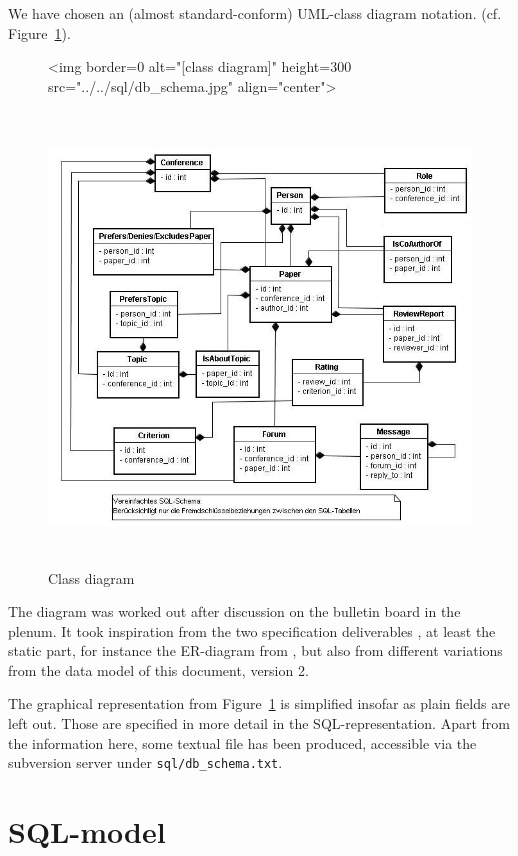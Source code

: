 We have chosen an (almost standard-conform) UML-class diagram notation.  (cf.
Figure~\ref{fig:classdiagram}).


\begin{figure}[htbp]
  \ifweb
  \centering
  \begin{rawhtml}
    <img border=0 alt="[class diagram]" height=300  src="../../sql/db_schema.jpg" align="center">
  \end{rawhtml}
  \else
  \centering
  \includegraphics[height=12cm]{../sql/db_schema}
  \fi
  \caption{Class diagram}
  \label{fig:classdiagram}
\end{figure}

The diagram was worked out after discussion on the bulletin board in the
plenum. It took inspiration from the two specification deliverables
\cite{coma:spec1} \cite{coma:spec2}, at least the static part, for instance
the ER-diagram from \cite{coma:spec1}, but also from different variations
from the data model of this document, version 2.

The graphical representation from Figure~\ref{fig:classdiagram} is
simplified insofar as plain fields are left out. Those are specified in
more detail in the SQL-representation. Apart from the information here,
some textual file has been produced, accessible via the subversion server under
\texttt{sql/db_schema.txt}.





\section{SQL-model}
\label{sec:datamodel.sql}
%



